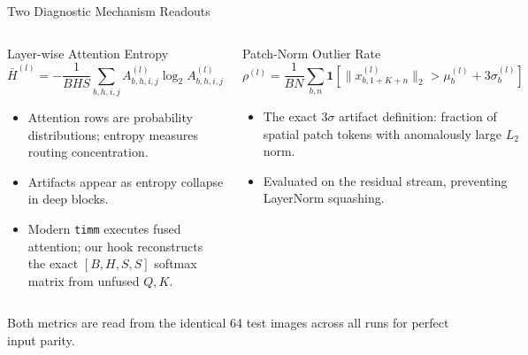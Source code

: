 \documentclass[aspectratio=169]{beamer}
\begin{document}
\begin{frame}{Two Diagnostic Mechanism Readouts}
\footnotesize
\begin{columns}[T]
\begin{block}{Layer-wise Attention Entropy}
$$\bar{H}^{(l)} = -\frac{1}{BHS} \sum_{b,h,i,j} A_{b,h,i,j}^{(l)} \log_2 A_{b,h,i,j}^{(l)}$$
\begin{itemize}\itemsep=1pt
\item Attention rows are probability distributions; entropy measures routing concentration.
\item Artifacts appear as entropy collapse in deep blocks.
\item Modern \texttt{timm} executes fused attention; our hook reconstructs the exact $[B, H, S, S]$ softmax matrix from unfused $Q, K$.
\end{itemize}
\end{block}

\begin{block}{Patch-Norm Outlier Rate}
$$\rho^{(l)} = \frac{1}{BN} \sum_{b,n} \mathbf{1}\left[ \|x_{b, 1+K+n}^{(l)}\|_2 > \mu_b^{(l)} + 3\sigma_b^{(l)} \right]$$
\begin{itemize}\itemsep=1pt
\item The exact $3\sigma$ artifact definition: fraction of spatial patch tokens with anomalously large $L_2$ norm.
\item Evaluated on the residual stream, preventing LayerNorm squashing.
\end{itemize}
\end{block}
\end{columns}

\smallskip
\centering
\scriptsize Both metrics are read from the identical 64 test images across all runs for perfect input parity.
\end{frame}
\end{document}

